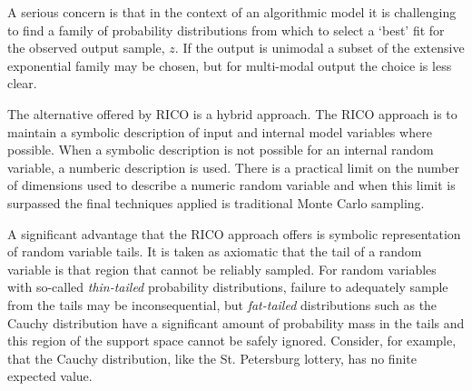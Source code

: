 A serious concern is that in the context of an algorithmic model it is challenging to find a family of probability distributions from which to select a `best' fit for the observed output sample, $z$. If the output is unimodal a subset of the extensive exponential family may be chosen, but for multi-modal output the choice is less clear. 

The alternative offered by RICO is a hybrid approach. The RICO approach is to maintain a symbolic description of input and internal model variables where possible. When a symbolic description is not possible for an internal random variable, a numberic description is used. There is a practical limit on the number of dimensions used to describe a numeric random variable and when this limit is surpassed the final techniques applied is traditional Monte Carlo sampling.

A significant advantage that the RICO approach offers is symbolic representation of random variable tails. It is taken as axiomatic that the tail of a random variable is that region that cannot be reliably sampled. For random variables with so-called \emph{thin-tailed} probability distributions, failure to adequately sample from the tails may be inconsequential, but \emph{fat-tailed} distributions such as the Cauchy distribution have a significant amount of probability mass in the tails and this region of the support space cannot be safely ignored. Consider, for example, that the Cauchy distribution, like the St. Petersburg lottery, has no finite expected value. 



